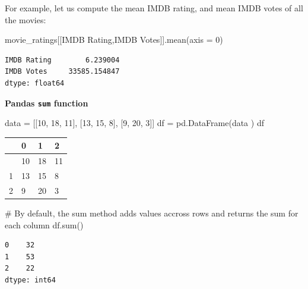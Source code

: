 \documentclass[
  letterpaper,
  DIV=11,
  numbers=noendperiod]{scrreprt}
\newenvironment{Shaded}{\begin{snugshade}}{\end{snugshade}}
\newcommand{\BuiltInTok}[1]{\textcolor[rgb]{0.00,0.23,0.31}{#1}}
\newcommand{\CommentTok}[1]{\textcolor[rgb]{0.37,0.37,0.37}{#1}}
\newcommand{\DecValTok}[1]{\textcolor[rgb]{0.68,0.00,0.00}{#1}}
\newcommand{\NormalTok}[1]{\textcolor[rgb]{0.00,0.23,0.31}{#1}}
\newcommand{\OperatorTok}[1]{\textcolor[rgb]{0.37,0.37,0.37}{#1}}
\newcommand{\StringTok}[1]{\textcolor[rgb]{0.13,0.47,0.30}{#1}}
\begin{document}
For example, let us compute the mean IMDB rating, and mean IMDB votes of
all the movies:

\begin{Shaded}
\begin{Highlighting}[]
\NormalTok{movie\_ratings[[}\StringTok{\textquotesingle{}IMDB Rating\textquotesingle{}}\NormalTok{,}\StringTok{\textquotesingle{}IMDB Votes\textquotesingle{}}\NormalTok{]].mean(axis }\OperatorTok{=} \DecValTok{0}\NormalTok{)}
\end{Highlighting}
\end{Shaded}

\begin{verbatim}
IMDB Rating        6.239004
IMDB Votes     33585.154847
dtype: float64
\end{verbatim}

\textbf{Pandas \texttt{sum} function}

\begin{Shaded}
\begin{Highlighting}[]
\NormalTok{data }\OperatorTok{=}\NormalTok{ [[}\DecValTok{10}\NormalTok{, }\DecValTok{18}\NormalTok{, }\DecValTok{11}\NormalTok{], [}\DecValTok{13}\NormalTok{, }\DecValTok{15}\NormalTok{, }\DecValTok{8}\NormalTok{], [}\DecValTok{9}\NormalTok{, }\DecValTok{20}\NormalTok{, }\DecValTok{3}\NormalTok{]]}
\NormalTok{df }\OperatorTok{=}\NormalTok{ pd.DataFrame(data )}
\NormalTok{df}
\end{Highlighting}
\end{Shaded}

\begin{longtable}[]{@{}llll@{}}
\toprule\noalign{}
& 0 & 1 & 2 \\
\midrule\noalign{}
\endhead
\bottomrule\noalign{}
\endlastfoot
0 & 10 & 18 & 11 \\
1 & 13 & 15 & 8 \\
2 & 9 & 20 & 3 \\
\end{longtable}

\begin{Shaded}
\begin{Highlighting}[]
\CommentTok{\# By default, the sum method adds values accross rows and returns the sum for each column}
\NormalTok{df.}\BuiltInTok{sum}\NormalTok{()}
\end{Highlighting}
\end{Shaded}

\begin{verbatim}
0    32
1    53
2    22
dtype: int64
\end{verbatim}
\end{document}
